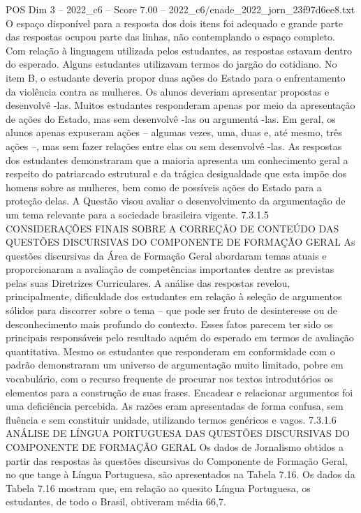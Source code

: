 \begin{textsample}{POS Dim 3 – 2022\_c6 – Score 7.00 – 2022\_c6/enade\_2022\_jorn\_23f97d6ee8.txt}
O espaço disponível para a resposta dos dois itens foi adequado e grande parte das respostas ocupou parte das linhas, não contemplando o espaço completo.
Com relação à linguagem utilizada pelos estudantes, as respostas estavam dentro do esperado.
Alguns estudantes utilizavam termos do jargão do cotidiano.
No item B, o estudante deveria propor duas ações do Estado para o enfrentamento da violência contra as mulheres.
Os alunos deveriam apresentar propostas e desenvolvê -las.
Muitos estudantes responderam apenas por meio da apresentação de ações do Estado, mas sem desenvolvê -las ou argumentá -las.
Em geral, os alunos apenas expuseram ações – algumas vezes, uma, duas e, até mesmo, três ações –, mas sem fazer relações entre elas ou sem desenvolvê -las.
As respostas dos estudantes demonstraram que a maioria apresenta um conhecimento geral a respeito do patriarcado estrutural e da trágica desigualdade que esta impõe dos homens sobre as mulheres, bem como de possíveis ações do Estado para a proteção delas.
A Questão visou avaliar o desenvolvimento da argumentação de um tema relevante para a sociedade brasileira vigente. 7.3.1.5 CONSIDERAÇÕES FINAIS SOBRE A CORREÇÃO DE CONTEÚDO DAS QUESTÕES DISCURSIVAS DO COMPONENTE DE FORMAÇÃO GERAL As questões discursivas da Área de Formação Geral abordaram temas atuais e proporcionaram a avaliação de competências importantes dentre as previstas pelas suas Diretrizes Curriculares.
A análise das respostas revelou, principalmente, dificuldade dos estudantes em relação à seleção de argumentos sólidos para discorrer sobre o tema – que pode ser fruto de desinteresse ou de desconhecimento mais profundo do contexto.
Esses fatos parecem ter sido os principais responsáveis pelo resultado aquém do esperado em termos de avaliação quantitativa.
Mesmo os estudantes que responderam em conformidade com o padrão demonstraram um universo de argumentação muito limitado, pobre em vocabulário, com o recurso frequente de procurar nos textos introdutórios os elementos para a construção de suas frases.
Encadear e relacionar argumentos foi uma deficiência percebida.
As razões eram apresentadas de forma confusa, sem fluência e sem constituir unidade, utilizando termos genéricos e vagos. 7.3.1.6 ANÁLISE DE LÍNGUA PORTUGUESA DAS QUESTÕES DISCURSIVAS DO COMPONENTE DE FORMAÇÃO GERAL Os dados de Jornalismo obtidos a partir das respostas às questões discursivas do Componente de Formação Geral, no que tange à Língua Portuguesa, são apresentados na Tabela 7.16.
Os dados da Tabela 7.16 mostram que, em relação ao quesito Língua Portuguesa, os estudantes, de todo o Brasil, obtiveram média 66,7.

\end{textsample}
